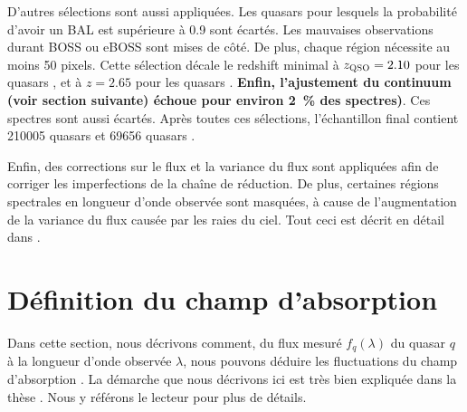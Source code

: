 \documentclass[11pt, twoside, a4paper, openright]{report}
\begin{document}
D'autres sélections sont aussi appliquées. Les quasars pour lesquels la probabilité d'avoir un BAL est supérieure à 0.9 sont écartés. Les mauvaises observations durant BOSS ou eBOSS sont mises de côté. De plus, chaque région nécessite au moins 50 pixels. Cette sélection décale le redshift minimal à $z_{\textsc{QSO}} = 2.10$ pour les quasars \lya{}, et à $z = 2.65$ pour les quasars \lyb{}. \textbf{Enfin, l'ajustement du continuum (voir section suivante) échoue pour environ \SI{2}{\percent} des spectres)}. Ces spectres sont aussi écartés.
Après toutes ces sélections, l'échantillon final contient \num{210005} quasars \lya{} et \num{69656} quasars \lyb{}. 

Enfin, des corrections sur le flux et la variance du flux sont appliquées afin de corriger les imperfections de la chaîne de réduction. De plus, certaines régions spectrales en longueur d'onde observée sont masquées, à cause de l'augmentation de la variance du flux causée par les raies du ciel. Tout ceci est décrit en détail dans \citet{CITE:dr16}.

\section{Définition du champ d'absorption}
Dans cette section, nous décrivons comment, du flux mesuré $f_q(\lambda)$ du quasar $q$ à la longueur d'onde observée $\lambda$, nous pouvons déduire les fluctuations du champ d'absorption \lya{}.
La démarche que nous décrivons ici est très bien expliquée dans la thèse \citet{CITE:Victoria}. Nous y référons le lecteur pour plus de détails.
\end{document}
